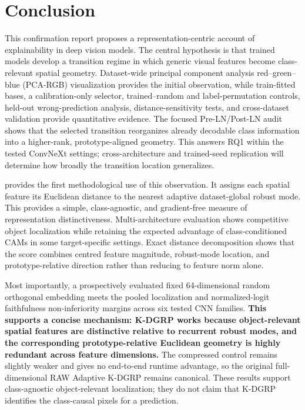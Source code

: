 \section{Conclusion}\label{sec:final-conclusion}

This confirmation report proposes a representation-centric account of
explainability in deep vision models. The central hypothesis is that trained
models develop a transition regime in which generic visual features become
class-relevant spatial geometry. Dataset-wide principal component analysis
red--green--blue (PCA-RGB) visualization provides the initial observation,
while train-fitted bases, a calibration-only selector, trained--random and
label-permutation controls, held-out wrong-prediction analysis,
distance-sensitivity tests, and cross-dataset validation provide quantitative
evidence. The focused Pre-LN/Post-LN audit shows that the selected transition
reorganizes already decodable class information into a higher-rank,
prototype-aligned geometry. This answers RQ1 within the tested ConvNeXt
settings; cross-architecture and trained-seed replication will determine how
broadly the transition location generalizes.

\methodname{} provides the first methodological use of this observation. It
assigns each spatial feature its Euclidean distance to the nearest adaptive
dataset-global robust mode. This provides a simple, class-agnostic, and
gradient-free measure of representation distinctiveness. Multi-architecture
evaluation shows competitive object localization while retaining the expected
advantage of class-conditioned CAMs in some target-specific settings. Exact
distance decomposition shows that the score combines centred feature
magnitude, robust-mode location, and prototype-relative direction rather than
reducing to feature norm alone.

Most importantly, a prospectively evaluated fixed 64-dimensional random
orthogonal embedding meets the pooled localization and normalized-logit
faithfulness non-inferiority margins across six tested CNN families.
\textbf{This supports a concise mechanism: K-DGRP
works because object-relevant spatial features are distinctive relative to
recurrent robust modes, and the corresponding prototype-relative Euclidean
geometry is highly redundant across feature dimensions.} The compressed
control remains slightly weaker and gives no end-to-end runtime advantage, so
the original full-dimensional RAW Adaptive K-DGRP remains canonical. These
results support class-agnostic object-relevant localization; they do not claim
that K-DGRP identifies the class-causal pixels for a prediction.

